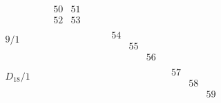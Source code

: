 \documentclass[12pt,a4paper]{amsart}
\begin{document}
\begin{align*}
\begin{array}{r||c|c|c|c|c|c}
&&
\begin{array}{r|r}%
50&51\\ \hline
52&53
\end{array}%
&& \\ \hline
    \begin{array}{r}
9/1\\ \\ \\
    \end{array}
    &&&&&
\begin{array}{rrr}
54&&\\
&55&\\
&&56
\end{array}%
& \\ \hline
    \begin{array}{r}
D_{18}/1\\ \\ \\
    \end{array}
    &&&&&&
\begin{array}{rrr}
57&&\\
&58&\\
&&59
\end{array}
  \end{array}
\end{align*}
\end{document}
